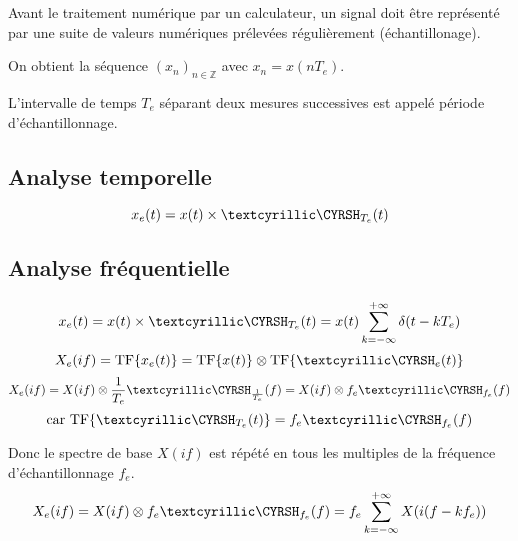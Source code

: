 \documentclass[a4paper,12pt]{report}
\begin{document}
Avant le traitement numérique par un calculateur, un signal doit être représenté par une suite de valeurs numériques prélevées régulièrement (échantillonage).

On obtient la séquence $(x_n)_{n \in \mathbb{Z}}$ avec $x_n = x(nT_e)$.

L'intervalle de temps $T_e$ séparant deux mesures successives est appelé période d'échantillonnage.

\subsection{Analyse temporelle}

\[ x_e(t) = x(t) \times \dirac_{T_e}(t) \]

\subsection{Analyse fréquentielle}

\[ x_e(t) = x(t) \times \dirac_{T_e}(t) = x(t) \sum_{k = -\infty}^{+\infty} \delta(t-kT_e) \]
\[ X_e(if) = \TF{ x_e(t)} = \TF{ x(t)} \otimes \TF{ \dirac_e(t)} \]
\[ X_e(if) = X(if) \otimes \dfrac{1}{T_e} \dirac_{\frac{1}{T_e}}(f) = X(if) \otimes f_e \dirac_{f_e}(f) \]
\[ \text{car } \TF{\dirac_{T_e}(t)} = f_e \dirac_{f_e}(f) \]

Donc le spectre de base $X(if)$ est répété en tous les multiples de la fréquence d'échantillonnage $f_e$.
\[ X_e(if) = X(if) \otimes f_e \dirac_{f_e}(f) = f_e \sum_{k = -\infty}^{+\infty} X(i(f-kf_e)) \]
\end{document}
